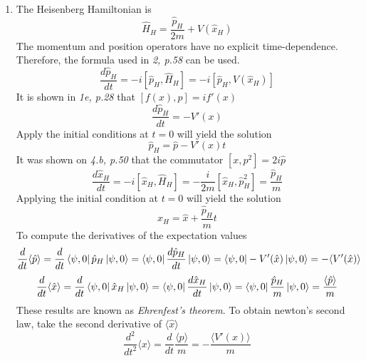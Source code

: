 \begin{sol}
\begin{enumerate}[label=\textbf{(\alph*)}]
\item
The Heisenberg Hamiltonian is 
\begin{equation}
	\hat H_H=\frac{\hat p_H}{2m}+V(\hat x_H)
\end{equation} 
The momentum and position operators have no explicit time-dependence. Therefore, the formula used in \textit{2, p.58} can be used. 
\begin{equation}
	\frac{d\hat p_H}{dt}=-i[\hat p_H,\hat H_H]=-i[\hat p_H,V(\hat x_H)]
\end{equation}
It is shown in \textit{1e, p.28} that $[f(x),p]=if'(x)$ 
\begin{equation}
	\frac{d\hat p_H}{dt}=-V'(x)
\end{equation}
Apply the initial conditions at $t=0$ will yield the solution
\begin{equation}
	\hat p_H=\hat p-V'(x)t
\end{equation} 
It was shown on \textit{4.b, p.50} that the commutator $[x,p^2]=2i\hat p$ 
\begin{equation}
	\frac{d\hat x_H}{dt}=-i[\hat x_H,\hat H_H]=-\frac{i}{2m}[\hat x_H,\hat p_H^2]=\frac{\hat p_H}{m}
\end{equation}
Applying the initial condition at $t=0$ will yield the solution
\begin{equation}
	\hat x_H=\hat x+\frac{\hat p_H}{m}t
\end{equation}
To compute the derivatives of the expectation values
\begin{equation}
	\frac{d}{dt}\langle \hat p\rangle=\frac{d}{dt}\bra{\psi,0}\hat p_H\ket{\psi,0}=\bra{\psi,0}\frac{d\hat p_H}{dt}\ket{\psi,0}=\bra{\psi,0}-V'(\hat x)\ket{\psi,0}=-\langle V'(\hat{x})\rangle
\end{equation} 
\begin{equation}
	\frac{d}{dt}\langle\hat x\rangle=\frac{d}{dt}\bra{\psi,0}\hat x_H\ket{\psi,0}=\bra{\psi,0}\frac{d\hat x_H}{dt}\ket{\psi,0}=\bra{\psi,0}\frac{\hat p_H}{m}\ket{\psi,0}=\frac{\langle \hat p\rangle}{m}
\end{equation} 
These results are known as \textit{Ehrenfest's theorem}. To obtain newton's second law, take the second derivative of $\langle \hat x\rangle$
\begin{equation}
	\frac{d^2}{dt^2}\langle x\rangle=\frac{d}{dt}\frac{\langle p\rangle}{m}=-\frac{\langle V'(x)\rangle}{m}
\end{equation} 

\end{enumerate}
\end{sol}
